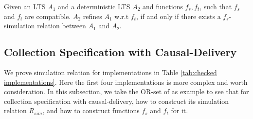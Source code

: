 
\begin{theorem}
\label{theorem:equivalence of our simulation and refinement}
Given an LTS $A_1$ and a deterministic LTS $A_2$ and functions $f_s,f_t$, such that $f_s$ and $f_t$ are compatible. $A_2$ refines $A_1$ w.r.t $f_t$, if and only if there exists a $f_s$-simulation relation between $A_1$ and $A_2$.
\end{theorem}



\subsection{Collection Specification with Causal-Delivery}
\label{subsec:collection specification with calusal-delivery}

{\color {red}We prove simulation relation for implementations in Table \ref{tab:checked implementations}. Here the first four implementations is more complex and worth consideration. In this subsection, we take the OR-set of \cite{Shapiro:2011} as example to see that for collection specification with causal-delivery, how to construct its simulation relation $R_{\mathit{sim}}$, and how to construct functions $f_s$ and $f_t$ for it.} 

